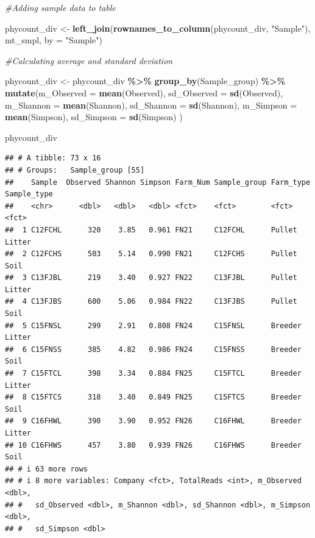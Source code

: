 \documentclass[
]{article}
\newenvironment{Shaded}{\begin{snugshade}}{\end{snugshade}}
\newcommand{\AttributeTok}[1]{\textcolor[rgb]{0.13,0.29,0.53}{#1}}
\newcommand{\CommentTok}[1]{\textcolor[rgb]{0.56,0.35,0.01}{\textit{#1}}}
\newcommand{\FunctionTok}[1]{\textcolor[rgb]{0.13,0.29,0.53}{\textbf{#1}}}
\newcommand{\NormalTok}[1]{#1}
\newcommand{\OtherTok}[1]{\textcolor[rgb]{0.56,0.35,0.01}{#1}}
\newcommand{\SpecialCharTok}[1]{\textcolor[rgb]{0.81,0.36,0.00}{\textbf{#1}}}
\newcommand{\StringTok}[1]{\textcolor[rgb]{0.31,0.60,0.02}{#1}}
\begin{document}
\begin{Shaded}
\begin{Highlighting}[]
\CommentTok{\#Adding sample data to table}

\NormalTok{phycount\_div }\OtherTok{\textless{}{-}} \FunctionTok{left\_join}\NormalTok{(}\FunctionTok{rownames\_to\_column}\NormalTok{(phycount\_div, }\StringTok{"Sample"}\NormalTok{),}
\NormalTok{                             mt\_smpl,}
                             \AttributeTok{by =} \StringTok{"Sample"}\NormalTok{)}

\CommentTok{\#Calculating average and standard deviation}

\NormalTok{phycount\_div }\OtherTok{\textless{}{-}}\NormalTok{ phycount\_div }\SpecialCharTok{\%\textgreater{}\%}
  \FunctionTok{group\_by}\NormalTok{(Sample\_group) }\SpecialCharTok{\%\textgreater{}\%}
  \FunctionTok{mutate}\NormalTok{(}\AttributeTok{m\_Observed =} \FunctionTok{mean}\NormalTok{(Observed),}
         \AttributeTok{sd\_Observed =} \FunctionTok{sd}\NormalTok{(Observed),}
         \AttributeTok{m\_Shannon =} \FunctionTok{mean}\NormalTok{(Shannon),}
         \AttributeTok{sd\_Shannon =} \FunctionTok{sd}\NormalTok{(Shannon),}
         \AttributeTok{m\_Simpson =} \FunctionTok{mean}\NormalTok{(Simpson),}
         \AttributeTok{sd\_Simpson =} \FunctionTok{sd}\NormalTok{(Simpson)}
\NormalTok{         )}

\NormalTok{phycount\_div}
\end{Highlighting}
\end{Shaded}

\begin{verbatim}
## # A tibble: 73 x 16
## # Groups:   Sample_group [55]
##    Sample  Observed Shannon Simpson Farm_Num Sample_group Farm_type Sample_type
##    <chr>      <dbl>   <dbl>   <dbl> <fct>    <fct>        <fct>     <fct>      
##  1 C12FCHL      320    3.85   0.961 FN21     C12FCHL      Pullet    Litter     
##  2 C12FCHS      503    5.14   0.990 FN21     C12FCHS      Pullet    Soil       
##  3 C13FJBL      219    3.40   0.927 FN22     C13FJBL      Pullet    Litter     
##  4 C13FJBS      600    5.06   0.984 FN22     C13FJBS      Pullet    Soil       
##  5 C15FNSL      299    2.91   0.808 FN24     C15FNSL      Breeder   Litter     
##  6 C15FNSS      385    4.82   0.986 FN24     C15FNSS      Breeder   Soil       
##  7 C15FTCL      398    3.34   0.884 FN25     C15FTCL      Breeder   Litter     
##  8 C15FTCS      318    3.40   0.849 FN25     C15FTCS      Breeder   Soil       
##  9 C16FHWL      390    3.90   0.952 FN26     C16FHWL      Breeder   Litter     
## 10 C16FHWS      457    3.80   0.939 FN26     C16FHWS      Breeder   Soil       
## # i 63 more rows
## # i 8 more variables: Company <fct>, TotalReads <int>, m_Observed <dbl>,
## #   sd_Observed <dbl>, m_Shannon <dbl>, sd_Shannon <dbl>, m_Simpson <dbl>,
## #   sd_Simpson <dbl>
\end{verbatim}
\end{document}
